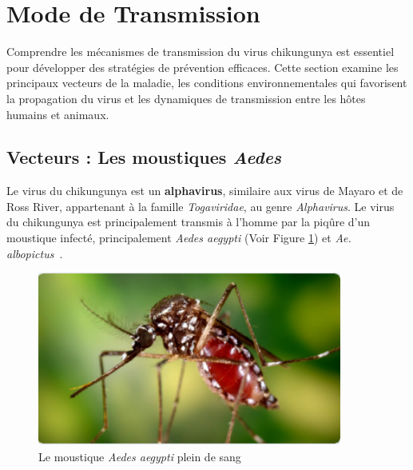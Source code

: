\section{Mode de Transmission}
Comprendre les mécanismes de transmission du virus chikungunya est essentiel pour développer des stratégies de prévention efficaces. Cette section examine les principaux vecteurs de la maladie, les conditions environnementales qui favorisent la propagation du virus et les dynamiques de transmission entre les hôtes humains et animaux.
\subsection{Vecteurs : Les moustiques \textit{Aedes}}
Le virus du chikungunya est un \textbf{alphavirus}, similaire aux virus de Mayaro et de Ross River, appartenant à la famille \textit{Togaviridae}, au genre \textit{Alphavirus}. Le virus du chikungunya est principalement transmis à l'homme par la piqûre d'un moustique infecté, principalement \textit{Aedes aegypti} (Voir Figure \ref{fig:aedes}) et \textit{Ae. albopictus}~\cite{chikvcdc}.
\begin{figure}[!h]
	\begin{center}
		\includegraphics[width=10cm]{images/moustique}
	\end{center}
	\caption{Le moustique \textit{Aedes aegypti }plein de sang~\cite{chikvcdc}}
	\label{fig:aedes}
\end{figure} 

